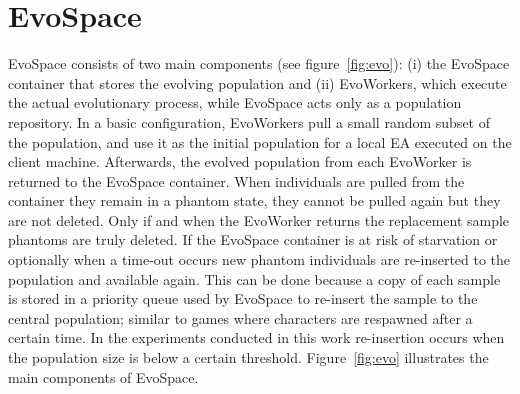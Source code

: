 \documentclass{llncs}
\begin{document}
 
\section{EvoSpace}
\label{sec:evo}
EvoSpace consists of two main components (see figure~\ref{fig:evo}): (i) the EvoSpace container that stores the evolving population and (ii) EvoWorkers, which execute the actual evolutionary process, while EvoSpace acts only as a population repository.
In a basic configuration, EvoWorkers pull a small random subset of the population, and use it as the initial population for a local EA executed on the client machine. Afterwards, the evolved population from each EvoWorker is returned to the EvoSpace container. When individuals are pulled from the container they remain in a phantom state, they cannot be pulled again but they are not deleted. Only if and when the EvoWorker returns the replacement sample phantoms are truly deleted. If the EvoSpace container is at risk of starvation or optionally when a time-out occurs new phantom individuals are re-inserted to the population and available again. This can be done because a copy of each sample is stored in a priority queue used by EvoSpace to re-insert the sample to the central population; similar to games where characters are respawned after a certain time. In the experiments conducted in this work re-insertion occurs when the population size is below a certain threshold. Figure~\ref{fig:evo} illustrates the main components of EvoSpace.
\end{document}
